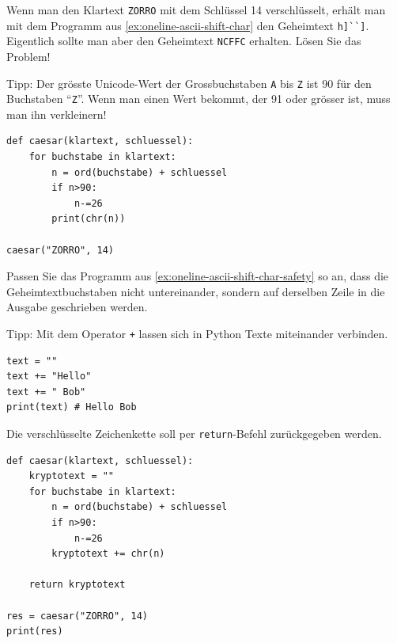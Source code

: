 \begin{myexercise}\label{ex:oneline-ascii-shift-char-safety}
    Wenn man den Klartext \texttt{ZORRO} mit dem Schlüssel 14 verschlüsselt, erhält man mit dem Programm aus \cref{ex:oneline-ascii-shift-char} den Geheimtext \lstinline|h]``]|. Eigentlich sollte man aber den Geheimtext \texttt{NCFFC} erhalten. Lösen Sie das Problem!

    Tipp: Der grösste Unicode-Wert der Grossbuchstaben \texttt{A} bis \texttt{Z} ist 90 für den Buchstaben \enquote{\texttt{Z}}. Wenn man einen Wert bekommt, der 91 oder grösser ist, muss man ihn verkleinern!

    \begin{myanswer}
        \begin{lstlisting}
def caesar(klartext, schluessel):
    for buchstabe in klartext:
        n = ord(buchstabe) + schluessel
        if n>90:
            n-=26
        print(chr(n))

caesar("ZORRO", 14)
\end{lstlisting}
    \end{myanswer}


\end{myexercise}

\begin{myexercise}\label{ex:oneline-ascii-shift-char-safety-final}
    Passen Sie das Programm aus \cref{ex:oneline-ascii-shift-char-safety} so an, dass die Geheimtextbuchstaben nicht untereinander, sondern auf derselben Zeile in die Ausgabe geschrieben werden.

    Tipp: Mit dem Operator \texttt{+} lassen sich in Python Texte miteinander verbinden.

    \begin{lstlisting}
text = ""
text += "Hello"
text += " Bob"
print(text) # Hello Bob
\end{lstlisting}

    Die verschlüsselte Zeichenkette soll per \lstinline|return|-Befehl zurückgegeben werden.

    \begin{myanswer}
        \begin{lstlisting}
def caesar(klartext, schluessel):
    kryptotext = ""
    for buchstabe in klartext:
        n = ord(buchstabe) + schluessel
        if n>90:
            n-=26
        kryptotext += chr(n)

    return kryptotext

res = caesar("ZORRO", 14)
print(res)
\end{lstlisting}
    \end{myanswer}
\end{myexercise}

